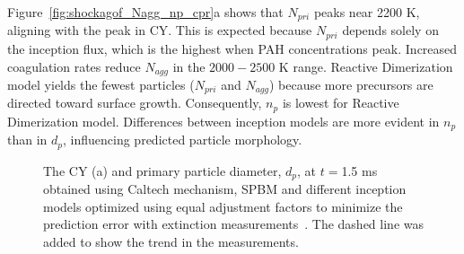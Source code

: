 Figure~\ref{fig:shockagof_Nagg_np_cpr}a shows that $N_{pri}$ peaks near 2200 K, aligning with the peak in CY. This is expected because $N_{pri}$ depends solely on the inception flux, which is the highest when PAH concentrations peak. Increased coagulation rates reduce $N_{agg}$ in the $2000-2500$ K range. Reactive Dimerization model yields the fewest particles ($N_{pri}$ and $N_{agg}$) because more precursors are directed toward surface growth. Consequently, $n_p$ is lowest for Reactive Dimerization model. Differences between inception models are more evident in $n_p$ than in $d_p$, influencing predicted particle morphology.

\begin{figure}[H]
	\centering
	\caption{The CY (a) and primary particle diameter, $d_p$, at $t=$1.5 ms obtained  using Caltech mechanism, SPBM and different inception models optimized using equal adjustment factors to minimize the prediction error with extinction measurements~\citep{agafonov2016unified}. The dashed line was added to show the trend in the measurements.}
	\label{fig:shockagof_yield_dp_cpr} 
\end{figure}


